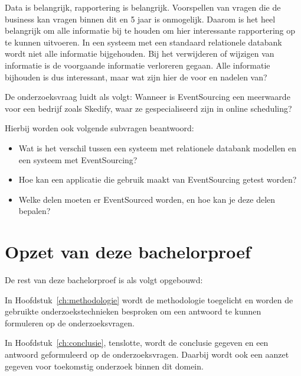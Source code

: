 Data is belangrijk, rapportering is belangrijk. Voorspellen van vragen die de business kan vragen binnen dit en 5 jaar is onmogelijk. Daarom is het heel belangrijk om alle informatie bij te houden om hier interessante rapportering op te kunnen uitvoeren. In een systeem met een standaard relationele databank wordt niet alle informatie bijgehouden. Bij het verwijderen of wijzigen van informatie is de voorgaande informatie verloreren gegaan. Alle informatie bijhouden is dus interessant, maar wat zijn hier de voor en nadelen van?

De onderzoeksvraag luidt als volgt: Wanneer is EventSourcing een meerwaarde voor een bedrijf zoals Skedify, waar ze gespecialiseerd zijn in online scheduling?

Hierbij worden ook volgende subvragen beantwoord:

\begin{itemize}
    \item Wat is het verschil tussen een systeem met relationele databank modellen en een systeem met EventSourcing?
    \item Hoe kan een applicatie die gebruik maakt van EventSourcing getest worden?
    \item Welke delen moeten er EventSourced worden, en hoe kan je deze delen bepalen?
\end{itemize}

\section{Opzet van deze bachelorproef}
\label{sec:opzet-bachelorproef}


De rest van deze bachelorproef is als volgt opgebouwd:

In Hoofdstuk~\ref{ch:methodologie} wordt de methodologie toegelicht en worden de gebruikte onderzoekstechnieken besproken om een antwoord te kunnen formuleren op de onderzoeksvragen.


In Hoofdstuk~\ref{ch:conclusie}, tenslotte, wordt de conclusie gegeven en een antwoord geformuleerd op de onderzoeksvragen. Daarbij wordt ook een aanzet gegeven voor toekomstig onderzoek binnen dit domein.

